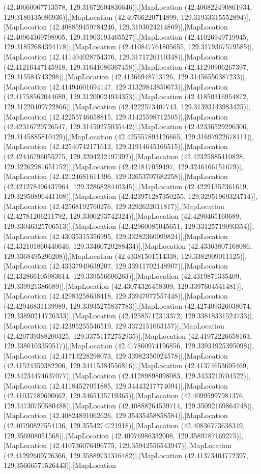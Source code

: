 (42.40660067713578, 129.31672604836646)],[MapLocation (42.406822490861934, 129.3180135086936)],[MapLocation (42.40766220714899, 129.31933315552894)],[MapLocation (42.408859459784246, 129.3193024214869)],[MapLocation (42.40964369798905, 129.31903193465527)],[MapLocation (42.41026949719945, 129.31852684394178)],[MapLocation (42.410847761805655, 129.3179367579585)],[MapLocation (42.411404028754376, 129.3171726110348)],[MapLocation (42.41216447145918, 129.31641086367458)],[MapLocation (42.41290906267397, 129.315584743298)],[MapLocation (42.41366948713126, 129.31456550387233)],[MapLocation (42.41494601694147, 129.31329843850673)],[MapLocation (42.41758562044689, 129.31200024934353)],[MapLocation (42.41850316954872, 129.31220409722866)],[MapLocation (42.4222573407743, 129.31393143983425)],[MapLocation (42.42255746658815, 129.31425598712505)],[MapLocation (42.42316729726547, 129.31450275035442)],[MapLocation (42.42336529296306, 129.3145885810429)],[MapLocation (42.425557893126665, 129.31697922678111)],[MapLocation (42.42540742171612, 129.31914645166515)],[MapLocation (42.42446796055275, 129.3204232197392)],[MapLocation (42.42325885410828, 129.32262981651752)],[MapLocation (42.421817059497, 129.3246166151679)],[MapLocation (42.42124681611396, 129.32653707682258)],[MapLocation (42.421278496437964, 129.3286828440345)],[MapLocation (42.42291352361619, 129.32950896441108)],[MapLocation (42.423971287350255, 129.32951969324714)],[MapLocation (42.42568192760276, 129.3292622011817)],[MapLocation (42.42781206211792, 129.3300293742324)],[MapLocation (42.4290465160689, 129.33046325706513)],[MapLocation (42.42960085045651, 129.33125719093354)],[MapLocation (42.43035315356995, 129.33282360099824)],[MapLocation (42.432101860440646, 129.33460720288434)],[MapLocation (42.43363807168086, 129.3368495296208)],[MapLocation (42.43381501514338, 129.3382909011125)],[MapLocation (42.43337949639207, 129.33911702148907)],[MapLocation (42.432866105983614, 129.339556606263)],[MapLocation (42.4319871335409, 129.339921386689)],[MapLocation (42.43074326458309, 129.3397604541481)],[MapLocation (42.42983258638418, 129.33947077557448)],[MapLocation (42.42946831139989, 129.33935275837783)],[MapLocation (42.427409326038074, 129.33890214726333)],[MapLocation (42.42585712313372, 129.33818331524733)],[MapLocation (42.42395255546519, 129.3372151063157)],[MapLocation (42.420739388200325, 129.33751172752935)],[MapLocation (42.41972226658163, 129.3380103359517)],[MapLocation (42.417860974196856, 129.33931925395098)],[MapLocation (42.41713228298073, 129.33982350924578)],[MapLocation (42.41524359382206, 129.34115384556816)],[MapLocation (42.41374653695469, 129.34234474637077)],[MapLocation (42.41289898098083, 129.3433210704522)],[MapLocation (42.41184527051885, 129.34443217774094)],[MapLocation (42.41037189690662, 129.3465135719365)],[MapLocation (42.40995997981376, 129.34730750580488)],[MapLocation (42.40888264539714, 129.35092169864748)],[MapLocation (42.40824891062626, 129.35435458858584)],[MapLocation (42.40790827554136, 129.3554274721918)],[MapLocation (42.40836773638349, 129.356908051568)],[MapLocation (42.40976986332008, 129.3589787169275)],[MapLocation (42.410736076496775, 129.35942556543947)],[MapLocation (42.41292609726366, 129.35889731316482)],[MapLocation (42.41373404772397, 129.35666571526443)],[MapLocation 